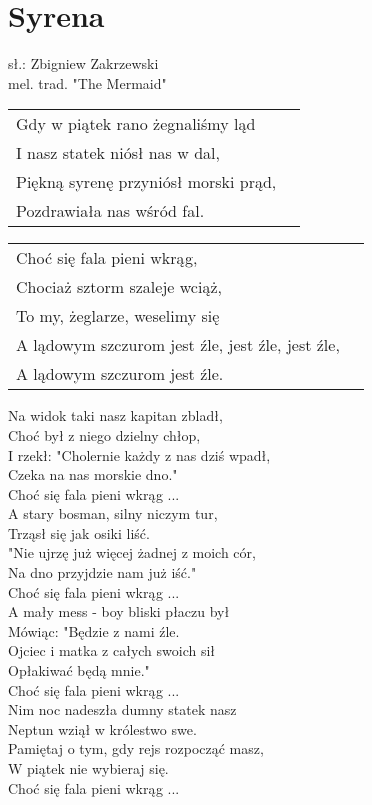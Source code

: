\section{Syrena}

sł.: Zbigniew Zakrzewski\\
mel. trad. "The Mermaid"

\vspace{2em}
\begin{tabular}{@{}p{10cm}@{}l@{}}
Gdy w piątek rano żegnaliśmy ląd \\
I nasz statek niósł nas w dal, \\
Piękną syrenę przyniósł morski prąd, \\
Pozdrawiała nas wśród fal. \\
\end{tabular}

\begin{tabular}{@{}p{10cm}@{}l@{}}
Choć się fala pieni wkrąg, \\
Chociaż sztorm szaleje wciąż, \\
To my, żeglarze, weselimy się \\
A lądowym szczurom jest źle, jest źle, jest źle, \\
A lądowym szczurom jest źle. \\
\end{tabular}

\vspace{1em}
Na widok taki nasz kapitan zbladł, \\
Choć był z niego dzielny chłop, \\
I rzekł: "Cholernie każdy z nas dziś wpadł, \\
Czeka na nas morskie dno." \\

Choć się fala pieni wkrąg ... \\

A stary bosman, silny niczym tur, \\
Trząsł się jak osiki liść. \\
"Nie ujrzę już więcej żadnej z moich cór, \\
Na dno przyjdzie nam już iść." \\

Choć się fala pieni wkrąg ... \\

A mały mess - boy bliski płaczu był \\
Mówiąc: "Będzie z nami źle. \\
Ojciec i matka z całych swoich sił \\
Opłakiwać będą mnie." \\

Choć się fala pieni wkrąg ... \\

Nim noc nadeszła dumny statek nasz \\
Neptun wziął w królestwo swe. \\
Pamiętaj o tym, gdy rejs rozpocząć masz, \\
W piątek nie wybieraj się. \\

Choć się fala pieni wkrąg ...  \\